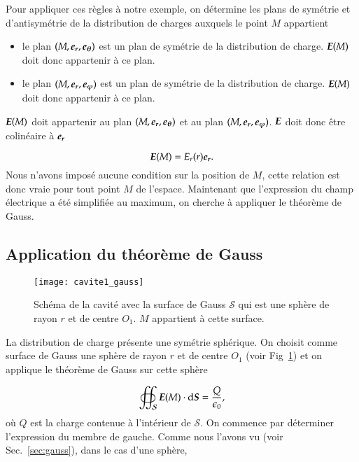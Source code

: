 Pour appliquer ces règles à notre exemple, on détermine les plans de symétrie 
et d'antisymétrie de la distribution de charges auxquels 
le point $M$ appartient

\begin{itemize}
	\item le plan $(M, \er, \etheta)$ est un plan de symétrie de la distribution
		de charge. $\vece(M)$ doit donc appartenir à ce plan.
        \item le plan $(M, \er, \ephi)$ est un plan de symétrie de la distribution de 
		charge. $\vece(M)$ doit donc appartenir à ce plan.
\end{itemize}

$\vece(M)$ doit appartenir au plan $(M, \er, \etheta)$ et au plan $(M, \er, \ephi)$.
$\vece$ doit donc être colinéaire à $\er$

\begin{equation}
	\vece(M) = E_r(r) \er.
\end{equation}
Nous n'avons imposé aucune condition sur la position de $M$, cette relation est
donc vraie pour tout point $M$ de l'espace. Maintenant que l'expression du 
champ électrique a été simplifiée au maximum, on cherche à appliquer le théorème
de Gauss.

\subsection{Application du théorème de Gauss}
\begin{figure}
	\centering
	\texttt{[image: cavite1\_gauss]}
	\caption{Schéma de la cavité avec la surface de Gauss $\mathcal{S}$
	         qui est une sphère de rayon $r$ et de centre $O_1$. $M$
	         appartient à cette surface.}%
	\label{fig:cavite_gauss}
\end{figure}

La distribution de charge présente une symétrie sphérique. On choisit comme surface 
de Gauss une sphère de rayon $r$ et de centre $O_1$ 
(voir Fig~\ref{fig:cavite_gauss}) et on applique le théorème de Gauss sur cette
sphère

\begin{equation}
	\oiint_\mathcal{S} \vece(M) \cdot \ds = \dfrac{Q}{\epsilon_0},
	\label{eq:cavite_gauss}
\end{equation}
où $Q$ est la charge contenue à l'intérieur de $\mathcal{S}$. On commence
par déterminer l'expression du membre de gauche. Comme nous l'avons vu 
(voir Sec.~\ref{sec:gauss}), dans le cas d'une sphère,

